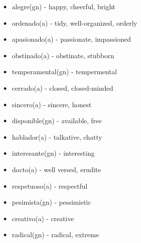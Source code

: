 \documentclass[12pt]{article}
\begin{document}
\begin{itemize}
            \item alegre(gn) - happy, cheerful, bright
            \item ordenado(a) - tidy, well-organized, orderly
            \item apasionado(a) - passionate, impassioned
            \item obstinado(a) - obstinate, stubborn
            \item temperamental(gn) - tempermental
            \item cerrado(a) - closed, closed-minded
            \item sincero(a) - sincere, honest
            \item disponible(gn) - available, free
            \item hablador(a) - talkative, chatty
            \item interesante(gn) - interesting
            \item docto(a) - well versed, erudite
            \item respetuoso(a) - respectful
            \item pesimista(gn) - pessimistic
            \item creativo(a) - creative
            \item radical(gn) - radical, extreme
        \end{itemize}
        
\end{document}
